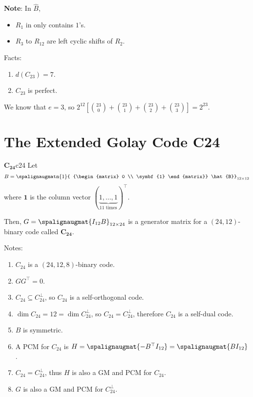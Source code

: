 \textbf{Note}: In $ \hat{B} $,
\begin{itemize}
    \item $ R_1 $ in only contains $ 1 $'s.
    \item $ R_3 $ to $ R_{12} $ are left cyclic shifts of $ R_2 $.
\end{itemize}

\begin{Theorem}{}{}
    Facts:
    \begin{enumerate}
        \item $ d(C_{23})=7 $.
        \item $ C_{23} $ is perfect.
    \end{enumerate}
\end{Theorem}

\begin{Proof}{}{}
    We know that $ e=3 $, so
    $ 2^{12}\left[ \binom{23}{0}+\binom{23}{1}+\binom{23}{2}+\binom{23}{3} \right]=
        2^{23} $.
\end{Proof}

\section{The Extended Golay Code C24}
\begin{Definition}{$ \symbf{C_{24}} $}{c24}
    Let
    \[ B=\spalignaugmatn{1}{
            {\begin{matrix}
                        0 \\
                        \symbf{1}
                    \end{matrix}}
            \hat{B}}_{12\times{} 12}
    \]
    where $ \symbf{1} $ is the column vector $ (\underbrace{1,\ldots ,1}_{11\text{ times}})^\top $.

    Then, $ G=\spalignaugmat{I_{12} B}_{12\times 24} $ is a generator
    matrix for a $ (24,12) $-binary code called $ \symbf{C_{24}} $.
\end{Definition}

Notes:
\begin{enumerate}[label=(\arabic*)]
    \item $ C_{24} $ is a $ (24,12,8) $-binary code.
    \item $ GG^\top=0 $.
    \item $ C_{24}\subseteq C_{24}^\perp $,
          so $ C_{24} $ is a self-orthogonal code.
    \item $ \dim{C_{24}}=12=\dim{C_{24}^\perp} $, so
          $ C_{24}=C_{24}^\perp $, therefore $ C_{24} $ is a self-dual code.
    \item $ B $ is symmetric.
    \item A PCM for $ C_{24} $ is $ H=\spalignaugmat{{-B^\top} I_{12}}=
              \spalignaugmat{B I_{12}} $.
    \item $ C_{24}=C_{24}^\perp $, thus $ H $ is also a GM and PCM for $ C_{24} $.
    \item $ G $ is also a GM and PCM for $ C_{24}^\perp $.
\end{enumerate}

